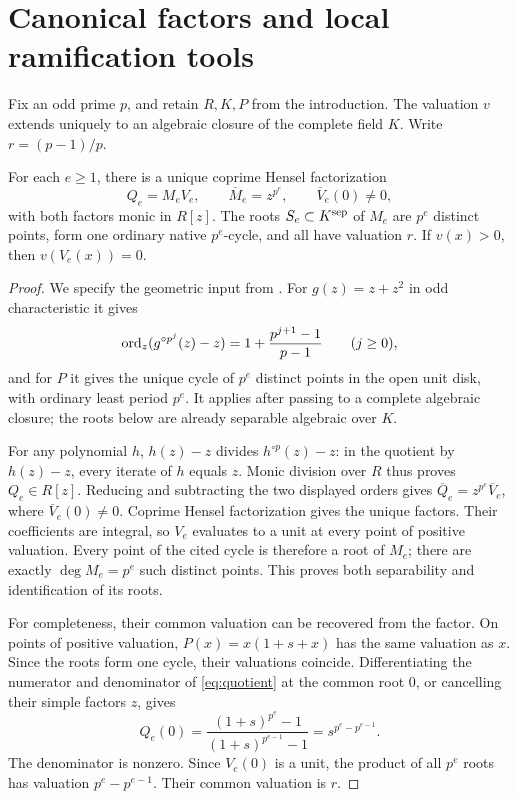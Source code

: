\section{Canonical factors and local ramification tools}\label{sec:setup}

Fix an odd prime \(p\), and retain \(R,K,P\) from the introduction.
The valuation \(v\) extends uniquely to an algebraic closure of the
complete field \(K\). Write \(r=(p-1)/p\).

\begin{lemma}\label{lem:small}
For each \(e\ge1\), there is a unique coprime Hensel factorization
\[
 Q_e=M_eV_e,\qquad \overline M_e=z^{p^e},\qquad
 \overline V_e(0)\ne0,
\]
with both factors monic in \(R[z]\).
The roots \(S_e\subset K^{\mathrm{sep}}\) of \(M_e\) are \(p^e\) distinct
points, form one ordinary native \(p^e\)-cycle, and all have
valuation \(r\). If \(v(x)>0\), then \(v(V_e(x))=0\).
\end{lemma}

\begin{proof}
We specify the geometric input from
\cite[Theorem C, its \(q=1\) case, and Proposition 4.4]{lindahl2016optimal}.
For \(g(z)=z+z^2\) in odd characteristic it gives
\[
 \operatorname{ord}_z(g^{\circ p^j}(z)-z)
 =1+\frac{p^{j+1}-1}{p-1}\qquad(j\ge0),
\]
and for \(P\) it gives the unique cycle of \(p^e\) distinct points
in the open unit disk, with ordinary least period \(p^e\).
It applies after passing to a complete algebraic closure; the roots
below are already separable algebraic over \(K\).

For any polynomial \(h\), \(h(z)-z\) divides \(h^{\circ p}(z)-z\):
in the quotient by \(h(z)-z\), every iterate of \(h\) equals \(z\).
Monic division over \(R\) thus proves \(Q_e\in R[z]\).
Reducing and subtracting the two displayed orders gives
\(\overline Q_e=z^{p^e}\overline V_e\), where
\(\overline V_e(0)\ne0\). Coprime Hensel factorization gives the
unique factors. Their coefficients are integral, so \(V_e\)
evaluates to a unit at every point of positive valuation.
Every point of the cited cycle is therefore a root of \(M_e\);
there are exactly \(\deg M_e=p^e\) such distinct points.
This proves both separability and identification of its roots.

For completeness, their common valuation can be recovered from
the factor. On points of positive valuation,
\(P(x)=x(1+s+x)\) has the same valuation as \(x\).
Since the roots form one cycle, their valuations coincide.
Differentiating the numerator and denominator of
\eqref{eq:quotient} at the common root \(0\), or cancelling their
simple factors \(z\), gives
\[
 Q_e(0)=
 \frac{(1+s)^{p^e}-1}{(1+s)^{p^{e-1}}-1}
 =s^{p^e-p^{e-1}}.
\]
The denominator is nonzero. Since \(V_e(0)\) is a unit, the
product of all \(p^e\) roots has valuation \(p^e-p^{e-1}\).
Their common valuation is \(r\).
\end{proof}

